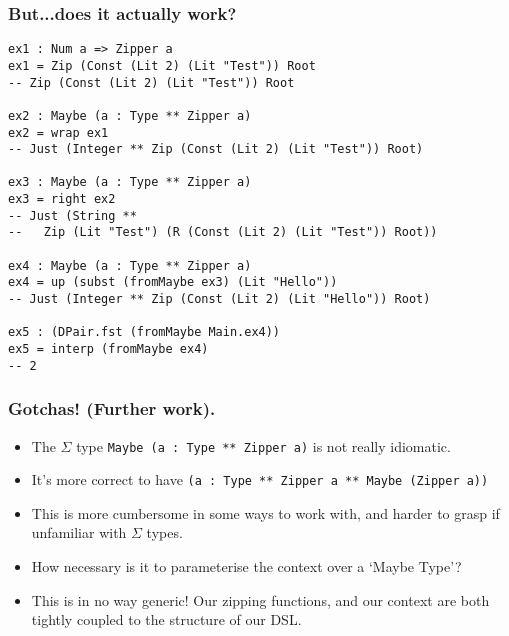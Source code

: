 \documentclass{beamer}
\begin{document}

\begin{frame}[fragile]
  \frametitle{But...does it actually work?}
  \begin{verbatim}
ex1 : Num a => Zipper a
ex1 = Zip (Const (Lit 2) (Lit "Test")) Root
-- Zip (Const (Lit 2) (Lit "Test")) Root

ex2 : Maybe (a : Type ** Zipper a)
ex2 = wrap ex1
-- Just (Integer ** Zip (Const (Lit 2) (Lit "Test")) Root)

ex3 : Maybe (a : Type ** Zipper a)
ex3 = right ex2
-- Just (String ** 
--   Zip (Lit "Test") (R (Const (Lit 2) (Lit "Test")) Root))

ex4 : Maybe (a : Type ** Zipper a)
ex4 = up (subst (fromMaybe ex3) (Lit "Hello"))
-- Just (Integer ** Zip (Const (Lit 2) (Lit "Hello")) Root)

ex5 : (DPair.fst (fromMaybe Main.ex4))
ex5 = interp (fromMaybe ex4)
-- 2
  \end{verbatim}
\end{frame}

\begin{frame}[fragile]
  \frametitle{Gotchas! (Further work).}
  \begin{itemize}
    \item The $\Sigma$ type \texttt{Maybe (a : Type ** Zipper a)}
      is not really idiomatic.
    \item It's more correct to have 
      \texttt{(a : Type ** Zipper a ** Maybe (Zipper a))}
    \item This is more cumbersome in some ways to work with, and harder to
      grasp if unfamiliar with $\Sigma$ types.
    \item How necessary is it to parameterise the context over a `Maybe Type'?
    \item This is in no way generic! Our zipping functions, and our context
      are both tightly coupled to the structure of our DSL. 
  \end{itemize}
\end{frame}
\end{document}
